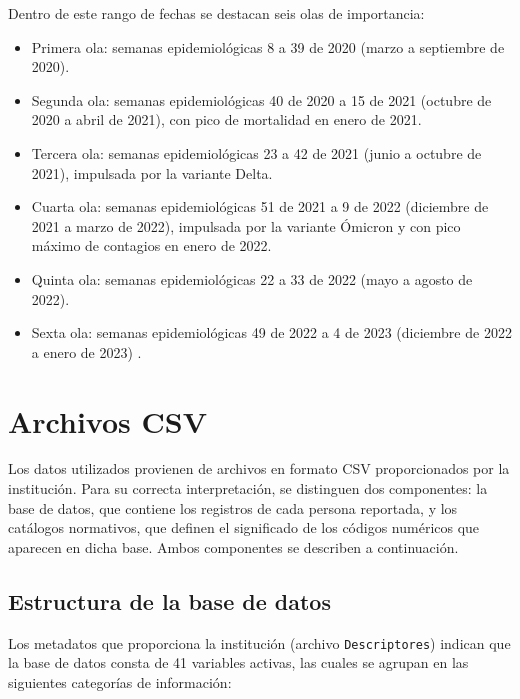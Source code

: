Dentro de este rango de fechas se destacan seis olas de importancia:

\begin{itemize}
    \item Primera ola: semanas epidemiológicas 8 a 39 de 2020 (marzo a septiembre de 2020).
    \item Segunda ola: semanas epidemiológicas 40 de 2020 a 15 de 2021 (octubre de 2020 a abril de 2021), con pico de mortalidad en enero de 2021.
    \item Tercera ola: semanas epidemiológicas 23 a 42 de 2021 (junio a octubre de 2021), impulsada por la variante Delta.
    \item Cuarta ola: semanas epidemiológicas 51 de 2021 a 9 de 2022 (diciembre de 2021 a marzo de 2022), impulsada por la variante Ómicron y con pico máximo de contagios en enero de 2022.
    \item Quinta ola: semanas epidemiológicas 22 a 33 de 2022 (mayo a agosto de 2022).
    \item Sexta ola: semanas epidemiológicas 49 de 2022 a 4 de 2023 (diciembre de 2022 a enero de 2023) \cite{gacetaunam2025}.
\end{itemize}

\section{Archivos CSV}

Los datos utilizados provienen de archivos en formato CSV proporcionados por la institución. Para su correcta interpretación, se distinguen dos componentes: la base de datos, que contiene los registros de cada persona reportada, y los catálogos normativos, que definen el significado de los códigos numéricos que aparecen en dicha base. Ambos componentes se describen a continuación.

\subsection{Estructura de la base de datos}

Los metadatos que proporciona la institución (archivo \texttt{Descriptores}) indican que la base de datos consta de 41 variables activas, las cuales se agrupan en las siguientes categorías de información:

